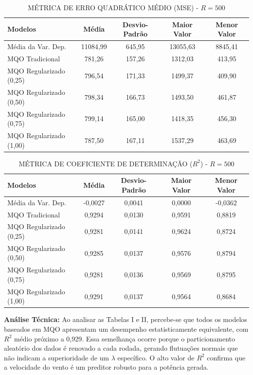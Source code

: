\documentclass[journal,onecolumn]{IEEEtran}
\begin{document}
\begin{table}[H]
\renewcommand{\arraystretch}{1.3}
\caption{MÉTRICA DE ERRO QUADRÁTICO MÉDIO (MSE) - $R=500$}
\centering
\begin{tabular}{lcccc}
\hline
\textbf{Modelos} & \textbf{Média} & \textbf{Desvio-Padrão} & \textbf{Maior Valor} & \textbf{Menor Valor} \\ \hline
Média da Var. Dep. & 11084,99 & 645,95 & 13055,63 & 8845,41 \\
MQO Tradicional & 781,26 & 157,26 & 1312,03 & 413,95 \\
MQO Regularizado (0,25) & 796,54 & 171,33 & 1499,37 & 409,90 \\
MQO Regularizado (0,50) & 798,34 & 166,73 & 1493,50 & 461,87 \\
MQO Regularizado (0,75) & 799,14 & 165,00 & 1418,35 & 456,30 \\
MQO Regularizado (1,00) & 787,50 & 167,11 & 1537,29 & 463,69 \\ \hline
\end{tabular}
\end{table}

\begin{table}[H]
\renewcommand{\arraystretch}{1.3}
\caption{MÉTRICA DE COEFICIENTE DE DETERMINAÇÃO ($R^2$) - $R=500$}
\centering
\begin{tabular}{lcccc}
\hline
\textbf{Modelos} & \textbf{Média} & \textbf{Desvio-Padrão} & \textbf{Maior Valor} & \textbf{Menor Valor} \\ \hline
Média da Var. Dep. & -0,0027 & 0,0041 & 0,0000 & -0,0362 \\
MQO Tradicional & 0,9294 & 0,0130 & 0,9591 & 0,8819 \\
MQO Regularizado (0,25) & 0,9281 & 0,0141 & 0,9624 & 0,8724 \\
MQO Regularizado (0,50) & 0,9285 & 0,0137 & 0,9576 & 0,8794 \\
MQO Regularizado (0,75) & 0,9281 & 0,0136 & 0,9569 & 0,8795 \\
MQO Regularizado (1,00) & 0,9291 & 0,0137 & 0,9564 & 0,8684 \\ \hline
\end{tabular}
\end{table}

\textbf{Análise Técnica:} Ao analisar as Tabelas I e II, percebe-se que todos os modelos baseados em MQO apresentam um desempenho estatisticamente equivalente, com $R^{2}$ médio próximo a 0,929. Essa semelhança ocorre porque o particionamento aleatório dos dados é renovado a cada rodada, gerando flutuações normais que não indicam a superioridade de um $\lambda$ específico. O alto valor de $R^{2}$ confirma que a velocidade do vento é um preditor robusto para a potência gerada.
\end{document}
